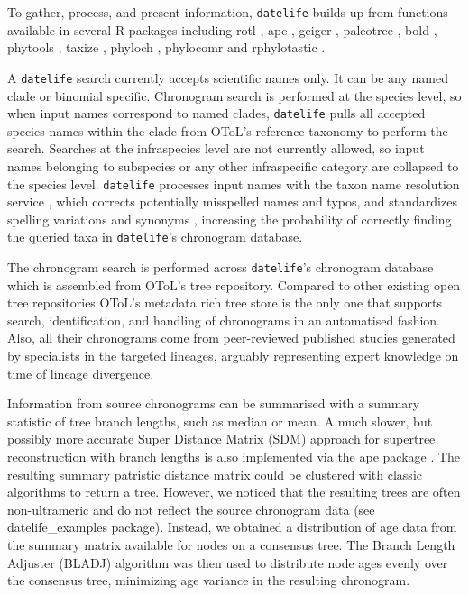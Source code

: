 \documentclass[11pt,]{article}
\begin{document}
To gather, process, and present information, \texttt{datelife} builds up
from functions available in several R packages including rotl
\citep{Michonneau2016}, ape \citep{Paradis2004}, geiger
\citep{Harmon2008}, paleotree \citep{Bapst2012a}, bold
\citep{Chamberlain2018}, phytools \citep{Revell2012}, taxize
\citep{Chamberlain2013, Chamberlain2018}, phyloch \citep{Heibl2008},
phylocomr \citep{Ooms2018} and rphylotastic \citep{Omeara2019}.

A \texttt{datelife} search currently accepts scientific names only. It
can be any named clade or binomial specific. Chronogram search is
performed at the species level, so when input names correspond to named
clades, \texttt{datelife} pulls all accepted species names within the
clade from OToL's reference taxonomy to perform the search. Searches at
the infraspecies level are not currently allowed, so input names
belonging to subspecies or any other infraspecific category are
collapsed to the species level. \texttt{datelife} processes input names
with the taxon name resolution service \citep[TNRS;][]{Boyle2013}, which
corrects potentially misspelled names and typos, and standardizes
spelling variations and synonyms , increasing the probability of
correctly finding the queried taxa in \texttt{datelife}'s chronogram
database.

The chronogram search is performed across \texttt{datelife}'s chronogram
database which is assembled from OToL's tree repository. Compared to
other existing open tree repositories OToL's metadata rich tree store is
the only one that supports search, identification, and handling of
chronograms in an automatised fashion. Also, all their chronograms come
from peer-reviewed published studies generated by specialists in the
targeted lineages, arguably representing expert knowledge on time of
lineage divergence.

Information from source chronograms can be summarised with a summary
statistic of tree branch lengths, such as median or mean. A much slower,
but possibly more accurate Super Distance Matrix (SDM) approach for
supertree reconstruction with branch lengths \citep{Criscuolo2006} is
also implemented via the ape package \citep{Paradis2004}. The resulting
summary patristic distance matrix could be clustered with classic
algorithms to return a tree. However, we noticed that the resulting
trees are often non-ultrameric and do not reflect the source chronogram
data (see datelife\_examples package). Instead, we obtained a
distribution of age data from the summary matrix available for nodes on
a consensus tree. The Branch Length Adjuster (BLADJ) algorithm
\citep{Webb2008} was then used to distribute node ages evenly over the
consensus tree, minimizing age variance in the resulting chronogram.
\end{document}
